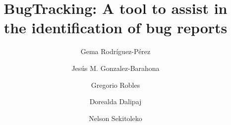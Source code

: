 \documentclass[runningheads,a4paper]{llncs}
\begin{document}
\mainmatter  %

\title{BugTracking: A tool to assist in the identification of bug reports}


%
%
\author{Gema Rodr\'iguez-P\'erez \and Jes\'us M. Gonzalez-Barahona \and Gregorio Robles \and  Dorealda Dalipaj \and Nelson Sekitoleko}


%


%
%

\maketitle
\end{document}
